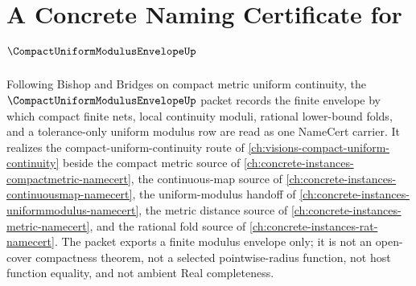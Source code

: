 \chapter{A Concrete Naming Certificate for $\CompactUniformModulusEnvelopeUp$}
\label{ch:concrete-instances-compact-uniform-modulus-envelope-namecert}

Following Bishop and Bridges on compact metric uniform continuity, the $\CompactUniformModulusEnvelopeUp$ packet records the finite envelope by which compact finite nets, local continuity moduli, rational lower-bound folds, and a tolerance-only uniform modulus row are read as one NameCert carrier. It realizes the compact-uniform-continuity route of \autoref{ch:visions-compact-uniform-continuity} beside the compact metric source of \autoref{ch:concrete-instances-compactmetric-namecert}, the continuous-map source of \autoref{ch:concrete-instances-continuousmap-namecert}, the uniform-modulus handoff of \autoref{ch:concrete-instances-uniformmodulus-namecert}, the metric distance source of \autoref{ch:concrete-instances-metric-namecert}, and the rational fold source of \autoref{ch:concrete-instances-rat-namecert}. The packet exports a finite modulus envelope only; it is not an open-cover compactness theorem, not a selected pointwise-radius function, not host function equality, and not ambient Real completeness.


